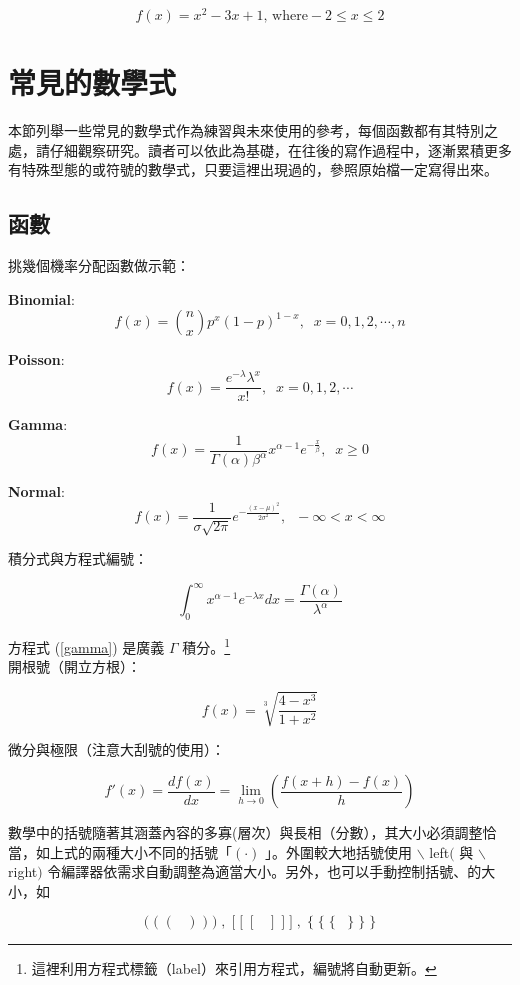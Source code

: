 $$f(x)=x^2-3x+1 \mbox{, where}  -2 \leq x \leq 2$$

\section{常見的數學式}
本節列舉一些常見的數學式作為練習與未來使用的參考，每個函數都有其特別之處，請仔細觀察研究。讀者可以依此為基礎，在往後的寫作過程中，逐漸累積更多有特殊型態的或符號的數學式，只要這裡出現過的，參照原始檔一定寫得出來。

\subsection{函數}
挑幾個機率分配函數做示範：

\textbf{Binomial}: 
$$f(x)={n\choose x}p^x(1-p)^{1-x}, \;\; x=0,1,2,\cdots,n$$ 

\textbf{Poisson}: 
$$f(x)=\frac{e^{-\lambda}\lambda^x}{x!}, \;\;  x=0,1,2,\cdots$$ 

\textbf{Gamma}: 
$$f(x)=\frac{1}{\Gamma(\alpha)\beta^\alpha}x^{\alpha-1}e^{-\frac{x}{\beta}}, \;\; x\geq 0$$

\textbf{Normal}: 
$$f(x)=\frac{1}{\sigma\sqrt{2\pi}}e^{-\frac{(x-\mu)^2}{2\sigma^2}}, \;\;  -\infty < x < \infty $$

\bigskip
積分式與方程式編號：
  
  \begin{equation}\label{gamma}%
  \int^\infty_0 x^{\alpha-1}e^{-\lambda x} dx = \frac{\Gamma(\alpha)}{\lambda^{\alpha}}
  \end{equation}
  
方程式  (\ref{gamma}) 是廣義 $\Gamma$ 積分。\footnote{這裡利用方程式標籤（label）來引用方程式，編號將自動更新。}\\
  
 開根號（開立方根）：
  
  $$f(x)=\sqrt[3]{\frac {\displaystyle 4-x^{3}}{\displaystyle 1+x^{2}}}$$
  
 微分與極限（注意大刮號的使用）：
  
  $$f'(x)=\frac{df(x)}{dx}=\lim_{h\rightarrow 0}\left(\frac{f(x+h)-f(x)}{h}\right)$$
  
數學中的括號隨著其涵蓋內容的多寡(層次）與長相（分數），其大小必須調整恰當，如上式的兩種大小不同的括號「$( \cdot)$ 」。外圍較大地括號使用 $\backslash$  left$($ 與 $\backslash$  right$)$ 令編譯器依需求自動調整為適當大小。另外，也可以手動控制括號、的大小，如

 $$ \bigg(\; \big( \;(\;\;\;) \;\big) \;\bigg) \;,\; \bigg[ \;\big[ \;[\;\;\;]\; \big]\; \bigg]\;,\; \bigg\{ \;\big\{ \;\{\;\;\;\} \;\big\} \;\bigg\}$$ 
  
